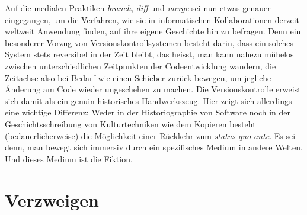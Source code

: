 \documentclass[a4paper,10pt]{article}
\begin{document}
Auf die medialen Praktiken \emph{branch}, \emph{diff} und \emph{merge} sei nun etwas genauer eingegangen, um die Verfahren, wie sie in informatischen Kollaborationen derzeit weltweit Anwendung finden, auf ihre eigene Geschichte hin zu befragen. Denn ein besonderer Vorzug von Versionskontrollsystemen besteht darin, dass ein solches System stets reversibel in der Zeit bleibt, das heisst, man kann nahezu mühelos zwischen unterschiedlichen Zeitpunkten der Codeentwicklung wandern, die Zeitachse also bei Bedarf wie einen Schieber zurück bewegen, um jegliche Änderung am Code wieder ungeschehen zu machen. Die Versionskontrolle erweist sich damit als ein genuin historisches Handwerkszeug. Hier zeigt sich allerdings eine wichtige Differenz: Weder in der Historiographie von Software noch in der Geschichtsschreibung von Kulturtechniken wie dem Kopieren besteht (bedauerlicherweise) die Möglichkeit einer Rückkehr zum \emph{status quo ante}. Es sei denn, man bewegt sich immersiv durch ein spezifisches Medium in andere Welten. Und dieses Medium ist die Fiktion.


\begin{comment}

Von der kurzen Geschichte der Sofware zur langen Geschichte der kollektiven Autorschaft. 

Konfliktlösung
Vorteil: Das Zurückgehen in der Zeit. 

Graphentheoretische Darstellung. Beispiel. Briefroman Gefährliche Liebschaften
Source Control. Kontrolle behalten über die Quellen. 

Kurze Erklärung anhand von \verb+https://en.wikipedia.org/wiki/Version_control+


Interessant: Statt single und zentralisiert, gibt's das System noch als \verb+https://en.wikipedia.org/wiki/Distributed_version_control+

\verb+https://en.wikipedia.org/wiki/Comparison_of_version_control_software#History_and_adoption+

\end{comment}


\enlargethispage{6mm}

\section{Verzweigen}
\end{document}

